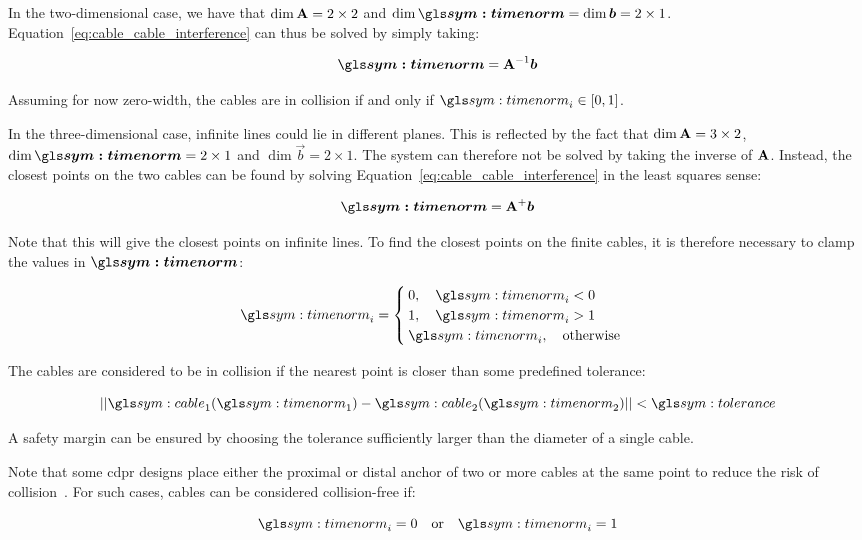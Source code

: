 	In the two-dimensional case, we have that $\dim\boldsymbol{\mathrm{A}} = 2\times2$ and
	$\dim\vec{\timenorm} = \dim\vec{b} = 2\times1$.
	Equation~\ref{eq:cable_cable_interference} can thus be solved by simply
	taking:

	\begin{equation}
		\vec{\timenorm} = {\mat{A}}^{-1}\vec{b}
	\end{equation}

	Assuming for now zero-width, the cables are in collision if and only if
	$\timenorm_i \in [0, 1]$.

	In the three-dimensional case, infinite lines could lie in different planes.
	This is reflected by the fact that $\dim\boldsymbol{\mathrm{A}} = 3\times2$,
	$\dim\vec{\timenorm} = 2\times1$ and $\dim\vec{b} = 2\times1$. The system
	can therefore not be solved by taking the inverse of $\boldsymbol{\mathrm{A}}$. Instead, the
	closest points on the two cables can be found by solving
	Equation~\ref{eq:cable_cable_interference} in the least squares sense:

	\begin{equation}
		\vec{\timenorm} = \pseudoinv{\mat{A}}\vec{b}
	\end{equation}

	Note that this will give the closest points on infinite lines. To find the
	closest points on the finite cables, it is therefore necessary to clamp the
	values in $\vec{\timenorm}$:

	\begin{equation}
		\timenorm_i =
		\begin{cases}
			0, \quad \timenorm_i < 0 \\
			1, \quad \timenorm_i > 1 \\
			\timenorm_i, \quad \text{otherwise}
		\end{cases}
	\end{equation}

	The cables are considered to be in collision if the nearest point is closer
	than some predefined tolerance:

	\begin{equation}
		\norm{\cable_1(\timenorm_1) - \cable_2(\timenorm_2)} < \tol
	\end{equation}

	A safety margin can be ensured by choosing the tolerance sufficiently larger
	than the diameter of a single cable.

	Note that some \gls{cdpr} designs place either the proximal or distal anchor
	of two or more cables at the same point to reduce the risk of
	collision~\cite{bib:cdpr:cable_driven_parallel_robots_theory_and_application}.
	For such cases, cables can be considered collision-free if:

	\begin{equation}
		\timenorm_i = 0 \quad\text{or}\quad \timenorm_i = 1
	\end{equation}
